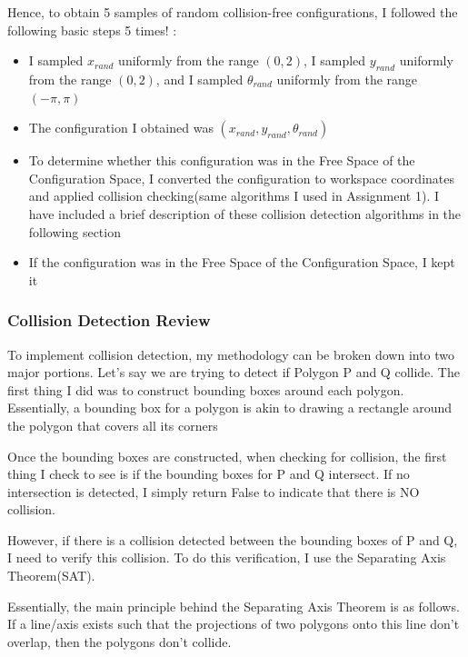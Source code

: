 \documentclass{article}
\begin{document}
Hence, to obtain 5 samples of random collision-free configurations, I followed the following basic steps 5 times! : 
\begin{itemize}
    \item I sampled $x_{rand}$ uniformly from the range $(0, 2)$, I sampled $y_{rand}$ uniformly from the range $(0, 2)$, and I sampled $\theta_{rand}$ uniformly from the range $(-\pi, \pi)$
    \item The configuration I obtained was $(x_{rand}, y_{rand}, \theta_{rand})$
    \item To determine whether this configuration was in the Free Space of the Configuration Space, I converted the configuration to workspace coordinates and applied collision checking(same algorithms I used in Assignment 1). I have included a brief description of these collision detection algorithms in the following section
    \item If the configuration was in the Free Space of the Configuration Space, I kept it
\end{itemize}

\subsubsection{Collision Detection Review}
To implement collision detection, my methodology can be broken down into two major portions. Let's say we are trying to detect if Polygon P and Q collide. The first thing I did was to construct bounding boxes around each polygon. Essentially, a bounding box for a polygon is akin to drawing a rectangle around the polygon that covers all its corners \newline 

Once the bounding boxes are constructed, when checking for collision, the first thing I check to see is if the bounding boxes for P and Q intersect. If no intersection is detected, I simply return False to indicate that there is NO collision. \newline 

However, if there is a collision detected between the bounding boxes of P and Q, I need to verify this collision. To do this verification, I use the Separating Axis Theorem(SAT). \newline 

Essentially, the main principle behind the Separating Axis Theorem is as follows. If a line/axis exists such that the projections of two polygons onto this line don't overlap, then the polygons don't collide. \newline 
\end{document}
